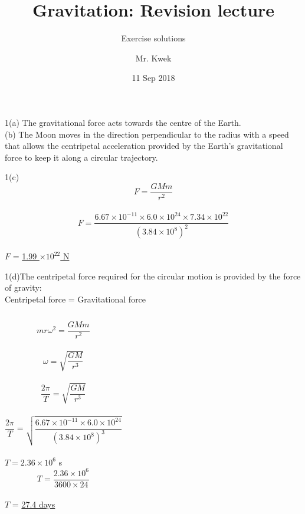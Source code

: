 \documentclass[10pt]{beamer}
\title{Gravitation: Revision lecture}
\subtitle{Exercise solutions}
\author{Mr. Kwek}
\institute
{ Physics Dept.,\\VJC}
\date{11 Sep 2018}
\begin{document}
\frame{\titlepage}


\begin{frame}
1(a) The gravitational force acts towards the centre of the Earth.\\
\vspace{10pt}
(b) The Moon moves in the direction perpendicular to the radius with a speed that allows the centripetal acceleration provided by the Earth's gravitational force to keep it along a circular trajectory.  
\end{frame}

\begin{frame}
1(c)\\ \[F=\frac{GMm}{r^2}\]\\
\[F=\frac{6.67\times 10^{-11}\times 6.0 \times 10^{24} \times 7.34 \times 10^{22}}{(3.84 \times 10^8)^2}\]\\
\vspace{10pt}
$F$ = \underline{1.99 $ \times 10^{22}$ N}\\
\end{frame}

\begin{frame}
1(d)The centripetal force required for the circular motion is provided by the force of gravity:\\
Centripetal force = Gravitational force\\
\begin{columns}
\[mr\omega^2= \frac{GMm}{r^2} \]\\ 
\[\omega= \sqrt{ \frac{GM}{r^3}} \]\\ 
\[ \frac{2\pi}{T}= \sqrt{ \frac{GM}{r^3}} \]\\ 
\[ \frac{2\pi}{T}= \sqrt{ \frac{6.67\times 10^{-11}\times 6.0 \times 10^{24}}{(3.84 \times 10^8)^3}} \]\\ 
$T = 2.36 \times 10^6 $ s\\ 
\[ T = \frac{2.36 \times 10^6}{3600 \times 24} \]  \\
\vspace{10pt}
$T$ = \underline{27.4 days}\\
\end{columns}
\end{frame}
\end{document}
